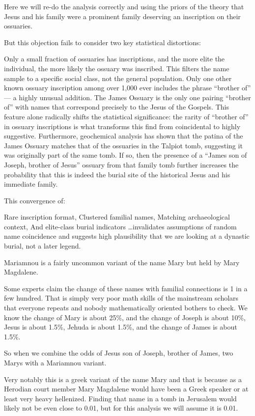 Here we will re-do the analysis correctly and using the priors of the theory that Jesus and his family were a prominent family deserving an inscription on their ossuaries.

But this objection fails to consider two key statistical distortions:

Only a small fraction of ossuaries has inscriptions, and the more elite the individual, the more likely the ossuary was inscribed.
This filters the name sample to a specific social class, not the general population.
Only one other known ossuary inscription among over 1,000 ever includes the phrase ``brother of'' --- a highly unusual addition.
The James Ossuary is the only one pairing ``brother of'' with names that correspond precisely to the Jesus of the Gospels.
This feature alone radically shifts the statistical significance: the rarity of ``brother of'' in ossuary inscriptions is what transforms this find from coincidental to highly suggestive.
Furthermore, geochemical analysis has shown that the patina of the James Ossuary matches that of the ossuaries in the Talpiot tomb, suggesting it was originally part of the same tomb.
If so, then the presence of a ``James son of Joseph, brother of Jesus'' ossuary from that family tomb further increases the probability that this is indeed the burial site of the historical Jesus and his immediate family.

This convergence of:

Rare inscription format, Clustered familial names, Matching archaeological context, And elite-class burial indicators \ldots invalidates assumptions of random name coincidence and suggests high plausibility that we are looking at a dynastic burial, not a later legend.

Mariamnou is a fairly uncommon variant of the name Mary but held by Mary Magdalene.

Some experts claim the change of these names with familial connections is 1 in a few hundred.
That is simply very poor math skills of the mainstream scholars that everyone repeats and nobody mathematically oriented bothers to check.
We know the change of Mary is about 25\%, and the change of Joseph is about 10\%, Jesus is about 1.5\%, Jehuda is about 1.5\%, and the change of James is about 1.5\%.

So when we combine the odds of Jesus son of Joseph, brother of James, two Marys with a Mariamnou variant.

Very notably this is a greek variant of the name Mary and that is because as a Herodian court member Mary Magdalene would have been a Greek speaker or at least very heavy hellenized.
Finding that name in a tomb in Jerusalem would likely not be even close to 0.01, but for this analysis we will assume it is 0.01.

